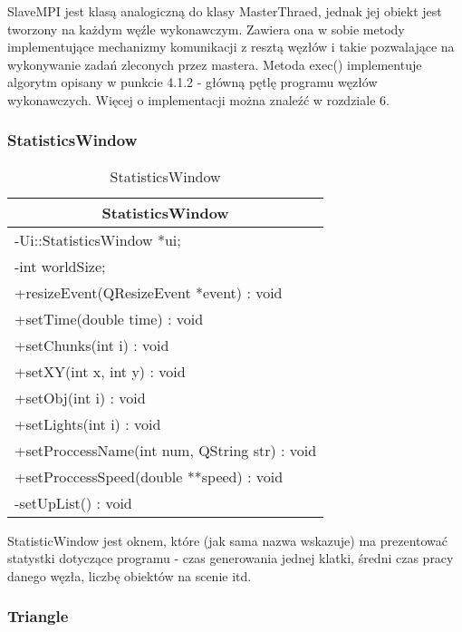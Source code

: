 SlaveMPI jest klasą analogiczną do klasy MasterThraed, jednak jej obiekt jest tworzony na każdym węźle wykonawczym. Zawiera ona w sobie metody implementujące mechanizmy komunikacji z resztą węzłów i takie pozwalające na wykonywanie zadań zleconych przez mastera. Metoda exec() implementuje algorytm opisany w punkcie 4.1.2 - główną pętlę programu węzłów wykonawczych. Więcej o implementacji można znaleźć w rozdziale 6.

\subsubsection{StatisticsWindow}

\footnotesize
\begin{longtable}{|p{14cm}|}
    \caption{StatisticsWindow} \label{tab:StatisticsWindow} \\ \hline
    \multicolumn{1}{|c|}{StatisticsWindow} \\ \hline
    -Ui::StatisticsWindow *ui; \\
    -int worldSize; \\
    \hline
	+resizeEvent(QResizeEvent *event) : void \\
    +setTime(double time) : void  \\
    +setChunks(int i) : void \\
    +setXY(int x, int y) : void \\
    +setObj(int i) : void \\
    +setLights(int i) : void  \\
    +setProccessName(int num, QString str) : void \\
    +setProccessSpeed(double **speed) : void \\
    -setUpList() : void \\
    \hline
\end{longtable}
\normalsize

StatisticWindow jest oknem, które (jak sama nazwa wskazuje) ma prezentować statystki dotyczące programu - czas generowania jednej klatki, średni czas pracy danego węzła, liczbę obiektów na scenie itd.

\newpage
\subsubsection{Triangle}


